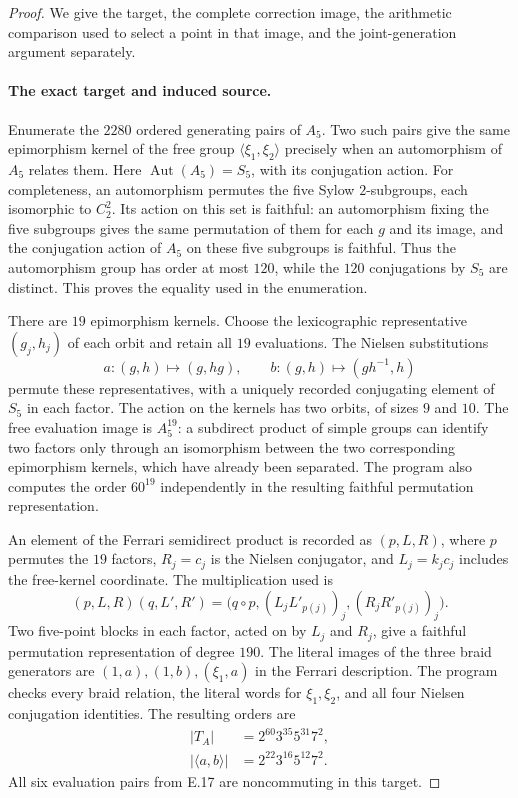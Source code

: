 \begin{proof}
We give the target, the complete correction image, the
arithmetic comparison used to select a point in that image,
and the joint-generation argument separately.

\paragraph{The exact target and induced source.}
Enumerate the $2280$ ordered generating pairs of $A_5$.
Two such pairs give the same epimorphism kernel of the
free group $\langle\xi_1,\xi_2\rangle$ precisely when an
automorphism of $A_5$ relates them. Here
$\operatorname{Aut}(A_5)=S_5$, with its conjugation action.
For completeness, an automorphism permutes the five Sylow
$2$-subgroups, each isomorphic to $C_2^2$. Its action on this
set is faithful: an automorphism fixing the five subgroups
gives the same permutation of them for each $g$ and its
image, and the conjugation action of $A_5$ on these five
subgroups is faithful. Thus the automorphism group has
order at most $120$, while the $120$ conjugations by $S_5$
are distinct. This proves the equality used in the enumeration.

There are $19$ epimorphism kernels. Choose the lexicographic
representative $(g_j,h_j)$ of each orbit and retain all
$19$ evaluations. The Nielsen substitutions
\[
 a:(g,h)\longmapsto(g,hg),\qquad
 b:(g,h)\longmapsto(gh^{-1},h)
 \tag{E.29.1}
\]
permute these representatives, with a uniquely recorded
conjugating element of $S_5$ in each factor. The action on
the kernels has two orbits, of sizes $9$ and $10$.
The free evaluation image is $A_5^{19}$: a subdirect
product of simple groups can identify two factors only
through an isomorphism between the two corresponding
epimorphism kernels, which have already been separated.
The program also computes the order $60^{19}$ independently
in the resulting faithful permutation representation.

An element of the Ferrari semidirect product is recorded
as $(p,L,R)$, where $p$ permutes the $19$ factors, $R_j=c_j$
is the Nielsen conjugator, and $L_j=k_jc_j$ includes the
free-kernel coordinate. The multiplication used is
\[
 (p,L,R)(q,L',R')=
 \bigl(q\circ p,(L_jL'_{p(j)})_j,(R_jR'_{p(j)})_j\bigr).
 \tag{E.29.2}
\]
Two five-point blocks in each factor, acted on by $L_j$
and $R_j$, give a faithful permutation representation of
degree $190$. The literal images of the three braid
generators are $(1,a),(1,b),(\xi_1,a)$ in the Ferrari
description. The program checks every braid relation,
the literal words for $\xi_1,\xi_2$, and all four
Nielsen conjugation identities. The resulting orders are
\[
 \begin{split}
 |T_A|&=2^{60}3^{35}5^{31}7^2,\\
 |\langle a,b\rangle|&=2^{22}3^{16}5^{12}7^2.
 \end{split}
 \tag{E.29.3}
\]
All six evaluation pairs from E.17 are noncommuting in
this target.


\end{proof}
